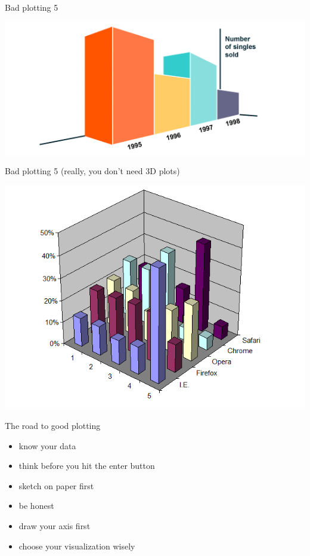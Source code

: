 \documentclass[
  ignorenonframetext,
]{beamer}
\providecommand{\tightlist}{%
  \setlength{\itemsep}{0pt}\setlength{\parskip}{0pt}}
\begin{document}
\begin{frame}{Bad plotting 5}
\protect\hypertarget{bad-plotting-5}{}

\includegraphics{fig/3d_1st.gif}

\end{frame}

\begin{frame}{Bad plotting 5 (really, you don't need 3D plots)}
\protect\hypertarget{bad-plotting-5-really-you-dont-need-3d-plots}{}

\includegraphics{fig/3d_2nd.png}

\end{frame}

\begin{frame}{The road to good plotting}
\protect\hypertarget{the-road-to-good-plotting}{}

\begin{itemize}
\tightlist
\item
  know your data
\item
  think before you hit the enter button
\item
  sketch on paper first
\item
  be honest
\item
  draw your axis first
\item
  choose your visualization wisely
\end{itemize}

\end{frame}
\end{document}
